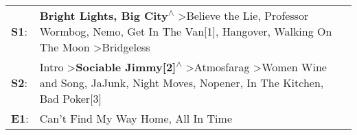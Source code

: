 \begin{supertabular}{p{0.03\textwidth}p{0.92\textwidth}}
 \textbf{S1}:  &                               \textbf{Bright Lights, Big City\textsuperscript{$\wedge$}} \textgreater \enspace Believe the Lie\textsuperscript{}, \enspace Professor Wormbog\textsuperscript{}, \enspace Nemo\textsuperscript{}, \enspace Get In The Van[1]\textsuperscript{}, \enspace Hangover\textsuperscript{}, \enspace Walking On The Moon\textsuperscript{} \textgreater \enspace Bridgeless\textsuperscript{}  \enspace  \\
 \textbf{S2}:  &  Intro\textsuperscript{} \textgreater \enspace \textbf{Sociable Jimmy[2]\textsuperscript{$\wedge$}} \textgreater \enspace Atmosfarag\textsuperscript{} \textgreater \enspace Women Wine and Song\textsuperscript{}, \enspace JaJunk\textsuperscript{}, \enspace Night Moves\textsuperscript{}, \enspace Nopener\textsuperscript{}, \enspace In The Kitchen\textsuperscript{}, \enspace Bad Poker[3]\textsuperscript{}  \enspace  \\
 \textbf{E1}:  &                                                                                                                                                                                                                                                                                                                                      Can't Find My Way Home\textsuperscript{}, \enspace All In Time\textsuperscript{}  \enspace  \\
\end{supertabular}
